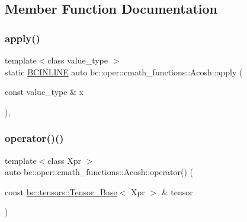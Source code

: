 \subsection{Member Function Documentation}
\mbox{\label{structbc_1_1oper_1_1cmath__functions_1_1Acosh_ab9fe3a2b62df67f130567a19b54934ca}} 
\subsubsection{\texorpdfstring{apply()}{apply()}}
{\footnotesize\ttfamily template$<$class value\+\_\+type $>$ \\
static \hyperlink{common_8h_a6699e8b0449da5c0fafb878e59c1d4b1}{B\+C\+I\+N\+L\+I\+NE} auto bc\+::oper\+::cmath\+\_\+functions\+::\+Acosh\+::apply (\begin{DoxyParamCaption}\item[{const value\+\_\+type \&}]{x }\end{DoxyParamCaption})\hspace{0.3cm}{\ttfamily [inline]}, {\ttfamily [static]}}

\mbox{\label{structbc_1_1oper_1_1cmath__functions_1_1Acosh_a4ee5951226fa7602ca79562912f34490}} 
\subsubsection{\texorpdfstring{operator()()}{operator()()}\hspace{0.1cm}{\footnotesize\ttfamily [1/3]}}
{\footnotesize\ttfamily template$<$class Xpr $>$ \\
auto bc\+::oper\+::cmath\+\_\+functions\+::\+Acosh\+::operator() (\begin{DoxyParamCaption}\item[{const \hyperlink{classbc_1_1tensors_1_1Tensor__Base}{bc\+::tensors\+::\+Tensor\+\_\+\+Base}$<$ Xpr $>$ \&}]{tensor }\end{DoxyParamCaption})\hspace{0.3cm}{\ttfamily [inline]}}

